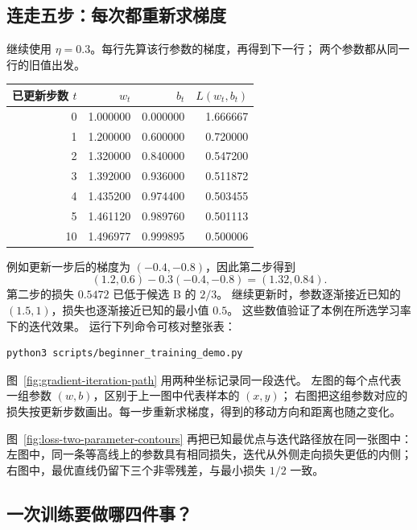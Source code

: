 \subsection{连走五步：每次都重新求梯度}
\label{experiment:beginner-iteration}

继续使用 $\eta=0.3$。每行先算该行参数的梯度，再得到下一行；
两个参数都从同一行的旧值出发。
\begin{center}\small
{}
\begin{tabular}{rrrr}
\toprule
已更新步数 $t$ & $w_t$ & $b_t$ & $L(w_t,b_t)$\\\midrule
0 & 1.000000 & 0.000000 & 1.666667\\
1 & 1.200000 & 0.600000 & 0.720000\\
2 & 1.320000 & 0.840000 & 0.547200\\
3 & 1.392000 & 0.936000 & 0.511872\\
4 & 1.435200 & 0.974400 & 0.503455\\
5 & 1.461120 & 0.989760 & 0.501113\\
10 & 1.496977 & 0.999895 & 0.500006\\
\bottomrule
\end{tabular}
\end{center}
例如更新一步后的梯度为 $(-0.4,-0.8)$，因此第二步得到
\[
(1.2,0.6)-0.3(-0.4,-0.8)=(1.32,0.84).
\]
第二步的损失 $0.5472$ 已低于候选 B 的 $2/3$。
继续更新时，参数逐渐接近已知的 $(1.5,1)$，损失也逐渐接近已知的最小值 $0.5$。
这些数值验证了本例在所选学习率下的迭代效果。
运行下列命令可核对整张表：
\begin{verbatim}
python3 scripts/beginner_training_demo.py
\end{verbatim}
图~\ref{fig:gradient-iteration-path} 用两种坐标记录同一段迭代。
左图的每个点代表一组参数 $(w,b)$，区别于上一图中代表样本的 $(x,y)$；
右图把这组参数对应的损失按更新步数画出。每一步重新求梯度，得到的移动方向和距离也随之变化。


图~\ref{fig:loss-two-parameter-contours} 再把已知最优点与迭代路径放在同一张图中：
左图中，同一条等高线上的参数具有相同损失，迭代从外侧走向损失更低的内侧；
右图中，最优直线仍留下三个非零残差，与最小损失 $1/2$ 一致。


\subsection{一次训练要做哪四件事？}
\label{intro:training-four-steps}

